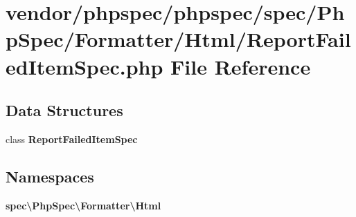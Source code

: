 \section{vendor/phpspec/phpspec/spec/\+Php\+Spec/\+Formatter/\+Html/\+Report\+Failed\+Item\+Spec.php File Reference}
\label{_report_failed_item_spec_8php}
\subsection*{Data Structures}
\begin{DoxyCompactItemize}
\item 
class {\bf Report\+Failed\+Item\+Spec}
\end{DoxyCompactItemize}
\subsection*{Namespaces}
\begin{DoxyCompactItemize}
\item 
 {\bf spec\textbackslash{}\+Php\+Spec\textbackslash{}\+Formatter\textbackslash{}\+Html}
\end{DoxyCompactItemize}
